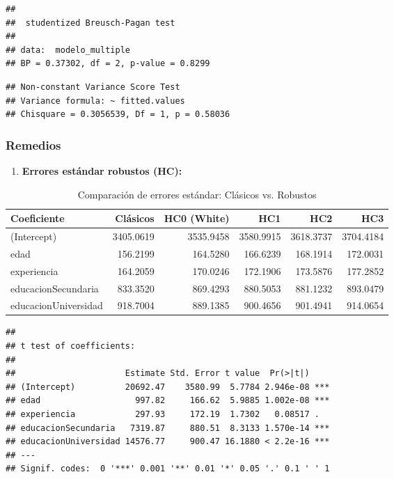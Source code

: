 \documentclass[
  oneside]{book}
\providecommand{\tightlist}{%
  \setlength{\itemsep}{0pt}\setlength{\parskip}{0pt}}
\begin{document}
\begin{verbatim}
## 
##  studentized Breusch-Pagan test
## 
## data:  modelo_multiple
## BP = 0.37302, df = 2, p-value = 0.8299
\end{verbatim}

\begin{verbatim}
## Non-constant Variance Score Test 
## Variance formula: ~ fitted.values 
## Chisquare = 0.3056539, Df = 1, p = 0.58036
\end{verbatim}

\subsubsection{Remedios}\label{remedios}

\begin{enumerate}
\def\labelenumi{\arabic{enumi}.}
\tightlist
\item
  \textbf{Errores estándar robustos (HC):}
\end{enumerate}

\begin{table}
\centering
\caption{\label{tab:errores-robustos}Comparación de errores estándar: Clásicos vs. Robustos}
\centering
\begin{tabular}[t]{l|r|r|r|r|r}
\hline
Coeficiente & Clásicos & HC0 (White) & HC1 & HC2 & HC3\\
\hline
(Intercept) & 3405.0619 & 3535.9458 & 3580.9915 & 3618.3737 & 3704.4184\\
\hline
edad & 156.2199 & 164.5280 & 166.6239 & 168.1914 & 172.0031\\
\hline
experiencia & 164.2059 & 170.0246 & 172.1906 & 173.5876 & 177.2852\\
\hline
educacionSecundaria & 833.3520 & 869.4293 & 880.5053 & 881.1232 & 893.0479\\
\hline
educacionUniversidad & 918.7004 & 889.1385 & 900.4656 & 901.4941 & 914.0654\\
\hline
\end{tabular}
\end{table}

\begin{verbatim}
## 
## t test of coefficients:
## 
##                      Estimate Std. Error t value  Pr(>|t|)    
## (Intercept)          20692.47    3580.99  5.7784 2.946e-08 ***
## edad                   997.82     166.62  5.9885 1.002e-08 ***
## experiencia            297.93     172.19  1.7302   0.08517 .  
## educacionSecundaria   7319.87     880.51  8.3133 1.570e-14 ***
## educacionUniversidad 14576.77     900.47 16.1880 < 2.2e-16 ***
## ---
## Signif. codes:  0 '***' 0.001 '**' 0.01 '*' 0.05 '.' 0.1 ' ' 1
\end{verbatim}
\end{document}
